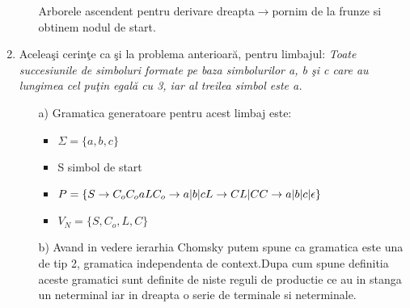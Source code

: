 \begin{enumerate}
\begin{enumerate}
\begin{figure}[H]
\end{figure}

Arborele ascendent pentru derivare dreapta$\rightarrow$pornim de la frunze si obtinem nodul de start.

\begin{figure}[H]
\end{figure}

\end{enumerate}

\item
Aceleaşi cerinţe ca şi la problema anterioară, pentru limbajul: \textit{Toate succesiunile de simboluri formate pe baza simbolurilor a, b şi c care au lungimea cel puţin egală cu 3, iar al treilea simbol este a.}

\begin{enumerate}
\item[a)]
Gramatica generatoare pentru acest limbaj este:
\begin{itemize}
\item $\Sigma = \{ a,b,c\}$
\item S simbol de start
\item $P=\{ S \rightarrow C_{o}C_{o}aL \newline 
C_{o} \rightarrow a|b|c \newline
L \rightarrow CL|C \newline
C \rightarrow a|b|c|\epsilon  \}$
\item $V_{N}=\{S, C_{o}, L, C\}$
\end{itemize}

\item[b)]
Avand in vedere ierarhia Chomsky putem spune ca gramatica este una de tip 2, gramatica independenta de context.Dupa cum spune definitia aceste gramatici sunt definite de niste reguli de productie ce au in stanga un neterminal iar in dreapta o serie de terminale si neterminale.


\end{enumerate}
\end{enumerate}
